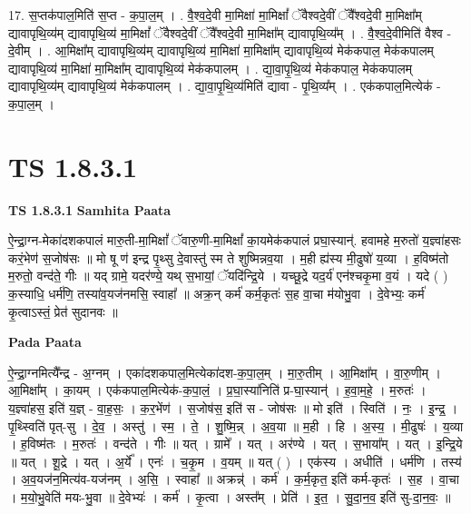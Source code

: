 \documentclass[17pt]{extarticle}
\begin{document}
17. स॒प्तक॑पाल॒मिति॑ स॒प्त - क॒पा॒ल॒म् । . वै॒श्व॒दे॒वी मा॒मिक्षा॑ मा॒मिक्षां᳚ ॅवैश्वदे॒वीं ॅवै᳚श्वदे॒वी मा॒मिक्षा᳚म् द्यावापृथि॒व्य॑म् द्यावापृथि॒व्य॑ मा॒मिक्षां᳚ ॅवैश्वदे॒वीं ॅवै᳚श्वदे॒वी मा॒मिक्षा᳚म् द्यावापृथि॒व्य᳚म् । . वै॒श्व॒दे॒वीमिति॑ वैश्व - दे॒वीम् । . आ॒मिक्षा᳚म् द्यावापृथि॒व्य॑म् द्यावापृथि॒व्य॑ मा॒मिक्षा॑ मा॒मिक्षा᳚म् द्यावापृथि॒व्य॑ मेक॑कपाल॒ मेक॑कपालम् द्यावापृथि॒व्य॑ मा॒मिक्षा॑ मा॒मिक्षा᳚म् द्यावापृथि॒व्य॑ मेक॑कपालम् । . द्या॒वा॒पृ॒थि॒व्य॑ मेक॑कपाल॒ मेक॑कपालम् द्यावापृथि॒व्य॑म् द्यावापृथि॒व्य॑ मेक॑कपालम् । . द्या॒वा॒पृ॒थि॒व्य॑मिति॑ द्यावा - पृ॒थि॒व्य᳚म् । . एक॑कपाल॒मित्येक॑ - क॒पा॒ल॒म् । \newline
\pagebreak
{}
\section*{ TS 1.8.3.1 }

\textbf{TS 1.8.3.1 } \newline
\textbf{Samhita Paata} \newline

ऐ॒न्द्रा॒ग्न-मेका॑दशकपालं मारु॒ती-मा॒मिक्षां᳚ ॅवारु॒णी-मा॒मिक्षां᳚ का॒यमेक॑कपालं प्रघा॒स्यान्॑. हवामहे म॒रुतो॑ य॒ज्ञ्वा॑हसः करं॒भेण॑ स॒जोष॑सः ॥ मो षू ण॑ इन्द्र पृ॒थ्सु दे॒वास्तु॑ स्म ते शुष्मिन्नव॒या । म॒ही ह्य॑स्य मी॒ढुषो॑ य॒व्या । ह॒विष्म॑तो म॒रुतो॒ वन्द॑ते॒ गीः ॥ यद् ग्रामे॒ यदर॑ण्ये॒ यथ् स॒भायां॒ ॅयदि॑न्द्रि॒ये । यच्छू॒द्रे यद॒र्य॑ एन॑श्चकृ॒मा व॒यं । यदे ( ) क॒स्याधि॒ धर्म॑णि॒ तस्या॑व॒यज॑नमसि॒ स्वाहा᳚ ॥ अक्र॒न् कर्म॑ कर्म॒कृतः॑ स॒ह वा॒चा म॑योभु॒वा । दे॒वेभ्यः॒ कर्म॑ कृ॒त्वाऽस्तं॒ प्रेत॑ सुदानवः ॥ \newline

\textbf{Pada Paata} \newline

ऐ॒न्द्रा॒ग्नमित्यै᳚न्द्र - अ॒ग्नम् । एका॑दशकपाल॒मित्येका॑दश-क॒पा॒ल॒म् । मा॒रु॒तीम् । आ॒मिक्षा᳚म् । वा॒रु॒णीम् । आ॒मिक्षा᳚म् । का॒यम् । एक॑कपाल॒मित्येक॑-क॒पा॒लं॒ । प्र॒घा॒स्या॑निति॑ प्र-घा॒स्यान्॑ । ह॒वा॒म॒हे॒ । म॒रुतः॑ । य॒ज्ञ्वा॑हस॒ इति॑ य॒ज्ञ् - वा॒ह॒सः॒ । क॒र॒भेंण॑ । स॒जोष॑स॒ इति॑ स - जोष॑सः ॥ मो इति॑ । स्विति॑ । नः॒ । इ॒न्द्र॒ । पृ॒थ्स्विति॑ पृत्-सु । दे॒व॒ । अस्तु॑ । स्म॒ । ते॒ । शु॒ष्मि॒न्न् । अ॒व॒या ॥ म॒ही । हि । अ॒स्य॒ । मी॒ढुषः॑ । य॒व्या । ह॒विष्म॑तः । म॒रुतः॑ । वन्द॑ते । गीः ॥ यत् । ग्रामे᳚ । यत् । अर॑ण्ये । यत् । स॒भाया᳚म् । यत् । इ॒न्द्रि॒ये ॥ यत् । शू॒द्रे । यत् । अ॒र्ये᳚ । एनः॑ । च॒कृ॒म । व॒यम् ॥ यत् ( ) । एक॑स्य । अधीति॑ । धर्म॑णि । तस्य॑ । अ॒व॒यज॑न॒मित्य॑व-यज॑नम् । अ॒सि॒ । स्वाहा᳚ ॥ अक्रन्न्॑ । कर्म॑ । क॒र्म॒कृत॒ इति॑ कर्म-कृतः॑ । स॒ह । वा॒चा । म॒यो॒भु॒वेति॑ मयः-भु॒वा ॥ दे॒वेभ्यः॑ । कर्म॑ । कृ॒त्वा । अस्त᳚म् । प्रेति॑ । इ॒त॒ । सु॒दा॒न॒व॒ इति॑ सु-दा॒न॒वः॒ ॥  \newline
\end{document}
